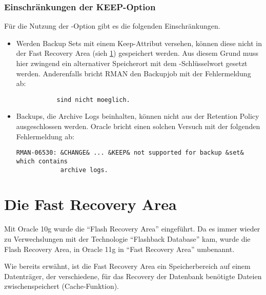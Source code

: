         \subsubsection{Einschr\"ankungen der KEEP-Option}
          F\"ur die Nutzung der -Option gibt es die folgenden Einschr\"ankungen.
          \begin{itemize}
            \item Werden Backup Sets mit einem Keep-Attribut versehen, k\"onnen diese nicht in der Fast Recovery Area (sieh \ref{configureflashrecoveryarea}) gespeichert werden. Aus diesem Grund muss hier zwingend ein alternativer Speicherort mit dem -Schl\"usselwort gesetzt werden. Anderenfalls bricht RMAN den Backupjob mit der Fehlermeldung ab:
            \begin{lstlisting}[caption={Keine Dateien mit KEEP-Attribut in der FRA aufbewahren!},label=admin1031,language=terminal]
% ORA-19811: Dateien in DB_RECOVERY_FILE_DEST mit Keep-Attribut
           sind nicht moeglich.
            \end{lstlisting}
            \item Backups, die Archive Logs beinhalten, k\"onnen nicht aus der Retention Policy ausgeschlossen werden. Oracle bricht einen solchen Versuch mit der folgenden Fehlermeldung ab:
            \begin{lstlisting}[caption={Backups mit Archive Logs d\"urfen kein KEEP-Attribut haben!},label=admin1032,language=terminal]
RMAN-06530: &CHANGE& ... &KEEP& not supported for backup &set& which contains
            archive logs.
            \end{lstlisting}
          \end{itemize}
    \section{Die Fast Recovery Area}
      \label{configureflashrecoveryarea}
      \begin{merke}
        Mit Oracle 10g wurde die \enquote{Flash Recovery Area} eingef\"uhrt. Da es immer wieder zu Verwechslungen mit der Technologie \enquote{Flashback Database} kam, wurde die Flash Recovery Area, in Oracle 11g in \enquote{Fast Recovery Area} umbenannt.
      \end{merke}
      Wie bereits erw\"ahnt, ist die Fast Recovery Area ein Speicherbereich auf einem Daten\-tr\"ager, der verschiedene, f\"ur das Recovery der Datenbank ben\"otigte Dateien zwischenspeichert (Cache-Funktion).

